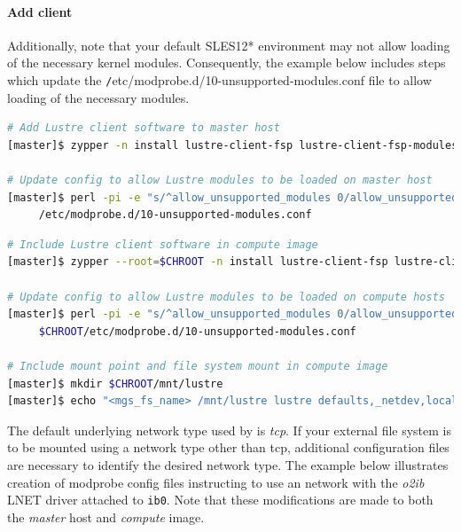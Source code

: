\documentclass[letterpaper]{article}
\newcommand{\baseOS}{SLES12*}
\begin{document}
\paragraph{Add \Lustre{} client} \label{sec:lustre_client}


Additionally, note that your default \baseOS{} environment may not allow loading of
the necessary \Lustre{} kernel modules. Consequently, the example below includes
steps which update the {\texttt /etc/modprobe.d/10-unsupported-modules.conf}
file to allow loading of the necessary modules.

\newpage
\begin{lstlisting}[language=bash,keywords={},upquote=true]
# Add Lustre client software to master host
[master]$ zypper -n install lustre-client-fsp lustre-client-fsp-modules

# Update config to allow Lustre modules to be loaded on master host
[master]$ perl -pi -e "s/^allow_unsupported_modules 0/allow_unsupported_modules 1/" \
     /etc/modprobe.d/10-unsupported-modules.conf
\end{lstlisting}

\begin{lstlisting}[language=bash,keywords={},upquote=true]
# Include Lustre client software in compute image
[master]$ zypper --root=$CHROOT -n install lustre-client-fsp lustre-client-fsp-modules

# Update config to allow Lustre modules to be loaded on compute hosts
[master]$ perl -pi -e "s/^allow_unsupported_modules 0/allow_unsupported_modules 1/" \
     $CHROOT/etc/modprobe.d/10-unsupported-modules.conf

# Include mount point and file system mount in compute image
[master]$ mkdir $CHROOT/mnt/lustre
[master]$ echo "<mgs_fs_name> /mnt/lustre lustre defaults,_netdev,localflock 0 0" >> $CHROOT/etc/fstab
\end{lstlisting}

The default underlying network type used by \Lustre{} is {\em tcp}. If your
external \Lustre{} file system is to be mounted using a network type other than
tcp, additional configuration files are necessary to identify the desired
network type. The example below illustrates creation of modprobe config files
instructing \Lustre{} to use an \InfiniBand{} network with the {\em o2ib} LNET driver
attached to \texttt{ib0}. Note that these modifications are made to both the
{\em master} host and {\em compute} image.
\end{document}

